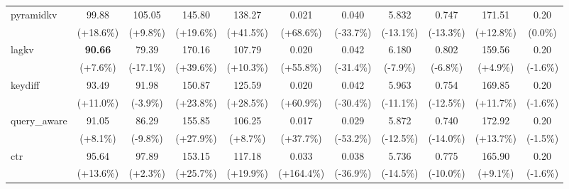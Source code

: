 \begin{table}[t]
{\begin{tabular}{l|cccccccccc}
    pyramidkv & 99.88 & 105.05 & 145.80 & 138.27 & 0.021 & 0.040 & 5.832 & 0.747 & 171.51 & 0.20 \\
     & {\tiny\color{red!70!black}(+18.6\%)} & {\tiny\color{red!70!black}(+9.8\%)} & {\tiny\color{red!70!black}(+19.6\%)} & {\tiny\color{red!70!black}(+41.5\%)} & {\tiny\color{red!70!black}(+68.6\%)} & {\tiny\color{green!60!black}(-33.7\%)} & {\tiny\color{green!60!black}(-13.1\%)} & {\tiny\color{green!60!black}(-13.3\%)} & {\tiny\color{green!60!black}(+12.8\%)} & {\tiny\color{gray}(0.0\%)} \\
    lagkv & \textbf{90.66} & 79.39 & 170.16 & 107.79 & 0.020 & 0.042 & 6.180 & 0.802 & 159.56 & 0.20 \\
     & {\tiny\color{red!70!black}(+7.6\%)} & {\tiny\color{green!60!black}(-17.1\%)} & {\tiny\color{red!70!black}(+39.6\%)} & {\tiny\color{red!70!black}(+10.3\%)} & {\tiny\color{red!70!black}(+55.8\%)} & {\tiny\color{green!60!black}(-31.4\%)} & {\tiny\color{green!60!black}(-7.9\%)} & {\tiny\color{green!60!black}(-6.8\%)} & {\tiny\color{green!60!black}(+4.9\%)} & {\tiny\color{green!60!black}(-1.6\%)} \\
    keydiff & 93.49 & 91.98 & 150.87 & 125.59 & 0.020 & 0.042 & 5.963 & 0.754 & 169.85 & 0.20 \\
     & {\tiny\color{red!70!black}(+11.0\%)} & {\tiny\color{green!60!black}(-3.9\%)} & {\tiny\color{red!70!black}(+23.8\%)} & {\tiny\color{red!70!black}(+28.5\%)} & {\tiny\color{red!70!black}(+60.9\%)} & {\tiny\color{green!60!black}(-30.4\%)} & {\tiny\color{green!60!black}(-11.1\%)} & {\tiny\color{green!60!black}(-12.5\%)} & {\tiny\color{green!60!black}(+11.7\%)} & {\tiny\color{green!60!black}(-1.6\%)} \\
    query\_aware & 91.05 & 86.29 & 155.85 & 106.25 & 0.017 & 0.029 & 5.872 & 0.740 & 172.92 & 0.20 \\
     & {\tiny\color{red!70!black}(+8.1\%)} & {\tiny\color{green!60!black}(-9.8\%)} & {\tiny\color{red!70!black}(+27.9\%)} & {\tiny\color{red!70!black}(+8.7\%)} & {\tiny\color{red!70!black}(+37.7\%)} & {\tiny\color{green!60!black}(-53.2\%)} & {\tiny\color{green!60!black}(-12.5\%)} & {\tiny\color{green!60!black}(-14.0\%)} & {\tiny\color{green!60!black}(+13.7\%)} & {\tiny\color{green!60!black}(-1.5\%)} \\
    ctr & 95.64 & 97.89 & 153.15 & 117.18 & 0.033 & 0.038 & 5.736 & 0.775 & 165.90 & 0.20 \\
     & {\tiny\color{red!70!black}(+13.6\%)} & {\tiny\color{red!70!black}(+2.3\%)} & {\tiny\color{red!70!black}(+25.7\%)} & {\tiny\color{red!70!black}(+19.9\%)} & {\tiny\color{red!70!black}(+164.4\%)} & {\tiny\color{green!60!black}(-36.9\%)} & {\tiny\color{green!60!black}(-14.5\%)} & {\tiny\color{green!60!black}(-10.0\%)} & {\tiny\color{green!60!black}(+9.1\%)} & {\tiny\color{green!60!black}(-1.6\%)} \\

\end{tabular}}
\end{table}
